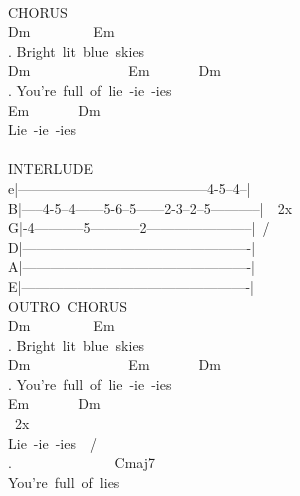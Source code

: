 {\\
CHORUS\\
Dm\ \ \ \ \ \ \ \ \ Em\\
. Bright\ lit\ blue\ skies\\
Dm\ \ \ \ \ \ \ \ \ \ \ \ \ \ Em\ \ \ \ \ \ \ Dm\\
. You're\ full\ of\ lie\ -ie\ -ies\\
Em\ \ \ \ \ \ \ Dm\\
Lie\ -ie\ -ies\\
\\
INTERLUDE\\
e|-----------------------------------------4-5--4--|\ \\ 
B|-----4-5--4------5-6--5------2-3--2--5-----------|\ \ 2x\\
G|-4-----------5-----------2-----------------------|\ /\\
D|-------------------------------------------------|\\
A|-------------------------------------------------|\\
E|-------------------------------------------------|\\
OUTRO\ CHORUS\\
Dm\ \ \ \ \ \ \ \ \ Em\\
. Bright\ lit\ blue\ skies\\
Dm\ \ \ \ \ \ \ \ \ \ \ \ \ \ Em\ \ \ \ \ \ \ Dm\\
. You're\ full\ of\ lie\ -ie\ -ies\\
Em\ \ \ \ \ \ \ Dm\ \ \ \\\ 2x\\
Lie\ -ie\ -ies\ \ /\\
. \ \ \ \ \ \ \ \ \ \ \ \ \ \ Cmaj7\\
You're\ full\ of\ lies}
